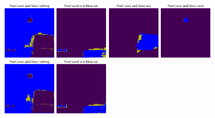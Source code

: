 \begin{figure}[h!]
  \centering
  \includegraphics[width=0.2\textwidth]{../../modelos-entrenados/unet-conv/ejecucion12/predvalmid0}
  \vrule
  \includegraphics[width=0.2\textwidth]{../../modelos-entrenados/unet-conv/ejecucion12/predvalmid3}
  \vrule
  \includegraphics[width=0.2\textwidth]{../../modelos-entrenados/unet-conv/ejecucion12/predvalmid6}
  \vrule
  \includegraphics[width=0.2\textwidth]{../../modelos-entrenados/unet-conv/ejecucion12/predvalmid85}
  \vrule
  \includegraphics[width=0.2\textwidth]{../../modelos-entrenados/unet-conv-conv/ejecucion14/predvalmid0}
  \vrule
  \includegraphics[width=0.2\textwidth]{../../modelos-entrenados/unet-conv-conv/ejecucion14/predvalmid3}

\end{figure}

